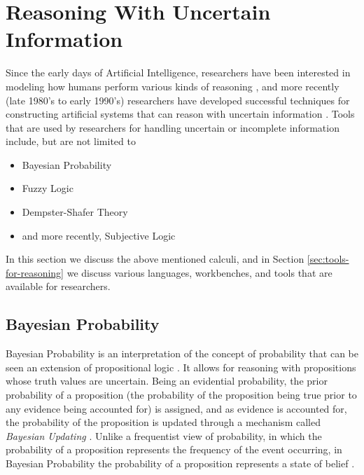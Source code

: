 \documentclass[thesis.tex]{subfiles}
\begin{document}
\section{Reasoning With Uncertain Information}
\label{sec:uncertain-reasoning}


Since the early days of Artificial Intelligence, researchers have been interested in modeling
how humans perform various kinds of reasoning \cite{russell2003}, and more recently (late 1980's to early 1990's)
researchers have developed successful techniques for constructing artificial systems that can reason with
uncertain information \cite{russell2003}. Tools that are used by researchers for handling uncertain or incomplete
information include, but are not limited to

\begin{itemize}
  \item Bayesian Probability
  \item Fuzzy Logic
  \item Dempster-Shafer Theory
  \item and more recently, Subjective Logic
\end{itemize}

In this section we discuss the above mentioned calculi, and in Section \ref{sec:tools-for-reasoning} we discuss
various languages, workbenches, and tools that are available for researchers.


%
%



\subsection{Bayesian Probability}

Bayesian Probability is an interpretation of the concept of probability that
can be seen an extension of propositional logic \cite{carnap1962logical}. It allows for reasoning with
propositions whose truth values are uncertain. Being an evidential probability,
the prior probability of a proposition (the probability of the proposition being
true prior to any evidence being accounted for) is assigned, and as evidence is
accounted for, the probability of the proposition is updated through a mechanism
called \emph{Bayesian Updating} \cite{paulos2011mathematics}. Unlike a frequentist
view of probability, in which the probability of a proposition represents the frequency
of the event occurring, in Bayesian Probability the probability of a proposition
represents a state of belief \cite{de1977theory}.
\end{document}
